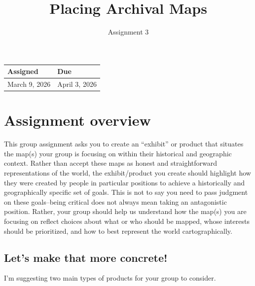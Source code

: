 \documentclass[
  letterpaper,
  DIV=11,
  numbers=noendperiod]{scrartcl}
\title{Placing Archival Maps}
\subtitle{Assignment 3}
\author{}
\date{}
\begin{document}
\maketitle


\begin{longtable}[]{@{}ll@{}}
\toprule\noalign{}
Assigned & Due \\
\midrule\noalign{}
\endhead
\bottomrule\noalign{}
\endlastfoot
March 9, 2026 & April 3, 2026 \\
\end{longtable}

\section{Assignment overview}\label{assignment-overview}

This group assignment asks you to create an ``exhibit'' or product that
situates the map(s) your group is focusing on within their historical
and geographic context. Rather than accept these maps as honest and
straightforward representations of the world, the exhibit/product you
create should highlight how they were created by people in particular
positions to achieve a historically and geographically specific set of
goals. This is not to say you need to pass judgment on these
goals--being critical does not always mean taking an antagonistic
position. Rather, your group should help us understand how the map(s)
you are focusing on reflect choices about what or who should be mapped,
whose interests should be prioritized, and how to best represent the
world cartographically.

\subsection{Let's make that more
concrete!}\label{lets-make-that-more-concrete}

I'm suggesting two main types of products for your group to consider.
\end{document}
